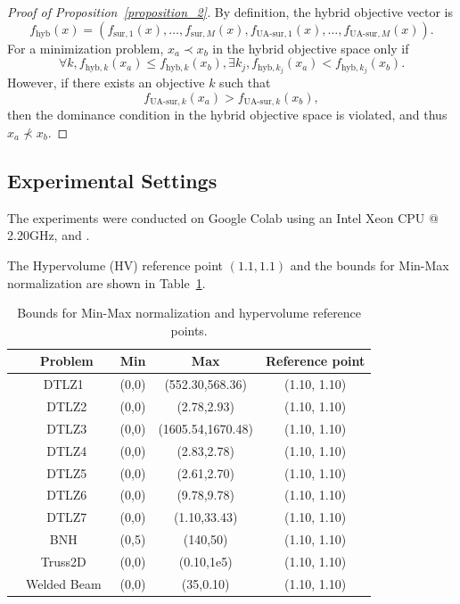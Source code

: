 \documentclass{article}
\begin{document}
\begin{proof}[Proof of Proposition~\ref{proposition_2}]
By definition, the hybrid objective vector is
\[
f_{\mathrm{hyb}}(x)
=
\left(
f_{\mathrm{sur},1}(x),\ldots,f_{\mathrm{sur},M}(x),
f_{\mathrm{UA\text{-}sur},1}(x),\ldots,f_{\mathrm{UA\text{-}sur},M}(x)
\right).
\]
For a minimization problem, $x_a \prec x_b$ in the hybrid objective space only if 
\[
\forall k, f_{\text{hyb},k}(x_a) \le f_{\text{hyb},k}(x_b), 
\exists k_j, f_{\text{hyb},k_j}(x_a) < f_{\text{hyb},k_j}(x_b).
\]
However, if there exists an objective $k$ such that
\[
f_{\mathrm{UA\text{-}sur},k}(x_a)
>
f_{\mathrm{UA\text{-}sur},k}(x_b),
\]
then the dominance condition in the hybrid objective space is violated,
and thus $x_a \not\prec x_b$.
\end{proof}

\subsection{Experimental Settings}
The experiments were conducted on Google Colab using an Intel Xeon CPU @ 2.20GHz, and .

The Hypervolume (HV) \cite{hypervolume} reference point $(1.1, 1.1)$ and the bounds \cite{benchmark} for Min-Max normalization \cite{indicator} are shown in Table~\ref{tab: reference_points}. 

\begin{table}[htbp]
\caption{Bounds for Min-Max normalization and hypervolume reference points.}
\label{tab: reference_points}
\centering
\begin{tabular}{lcccc}
\toprule
&Problem &Min &Max &Reference point \\
\midrule
&DTLZ1~\cite{opt_dtlz} &(0,0) &(552.30,568.36) &(1.10, 1.10) \\
&DTLZ2 &(0,0) &(2.78,2.93) &(1.10, 1.10) \\
&DTLZ3 &(0,0) &(1605.54,1670.48) &(1.10, 1.10) \\
&DTLZ4 &(0,0) &(2.83,2.78) &(1.10, 1.10) \\
&DTLZ5 &(0,0) &(2.61,2.70) &(1.10, 1.10) \\
&DTLZ6 &(0,0) &(9.78,9.78) &(1.10, 1.10) \\
&DTLZ7 &(0,0) &(1.10,33.43) &(1.10, 1.10) \\
&BNH~\cite{bnh} &(0,5) &(140,50) &(1.10, 1.10) \\
&Truss2D~\cite{truss2d} &(0,0) &(0.10,1e5) &(1.10, 1.10) \\
&Welded Beam~\cite{welded_beam} &(0,0) &(35,0.10) &(1.10, 1.10) \\
\bottomrule
\end{tabular}


\end{table}
\end{document}
